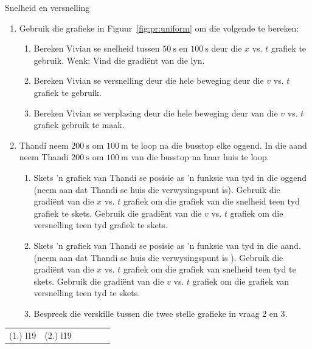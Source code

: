 \begin{exercises}{Snelheid en versnelling}
\begin{enumerate}[noitemsep, label=\textbf{\arabic*}. ] 
\item Gebruik die grafieke in Figuur~\ref{fig:pr:uniform} om die volgende te bereken:
\begin{enumerate}[noitemsep, label=\textbf{\alph*}. ] 
    \item Bereken Vivian se snelheid tussen $50~\text{s}$ en $100~\text{s}$ deur die $x$ vs. $t$ grafiek te gebruik. Wenk: Vind die gradi\"ent van die lyn.
    \item Bereken Vivian se versnelling deur die hele beweging deur die $v$ vs. $t$ grafiek te gebruik.
    \item Bereken Vivian se verplasing deur die hele beweging deur van die $v$ vs. $t$ grafiek gebruik te maak.
\end{enumerate}

\item Thandi neem $200~\text{s}$ om  $100~\text{m}$ te loop na die busstop elke oggend. In die aand neem Thandi $200~\text{s}$ om $100~\text{m}$ van die busstop na haar huis te loop.

\begin{enumerate}[noitemsep, label=\textbf{\alph*}. ] 
    \item  Skets 'n grafiek van Thandi se posisie as 'n funksie van tyd in die oggend (neem aan dat Thandi se huis die verwysingspunt is). Gebruik die gradi\"ent van die $x$ vs. $t$ grafiek om die grafiek van die snelheid teen tyd grafiek te skets. Gebruik die gradi\"ent van die $v$ vs. $t$ grafiek om die versnelling teen tyd grafiek te skets.
    \item  Skets 'n grafiek van Thandi se posisie as 'n funksie van tyd in die aand. (neem aan dat Thandi se huis die verwysingspunt is ). Gebruik die gradi\"ent van die $x$ vs. $t$ grafiek om die grafiek van snelheid teen tyd te skets. Gebruik die gradi\"ent van die $v$ vs. $t$ grafiek om die grafiek van versnelling teen tyd te skets.
    \item Bespreek die verskille tussen die twee stelle grafieke in vraag 2 en 3.
\end{enumerate}
\end{enumerate}

\practiceinfo
\par \begin{tabular}[h]{cccccc}
(1.) l19  &  (2.) l19  & \end{tabular}
\end{exercises}



